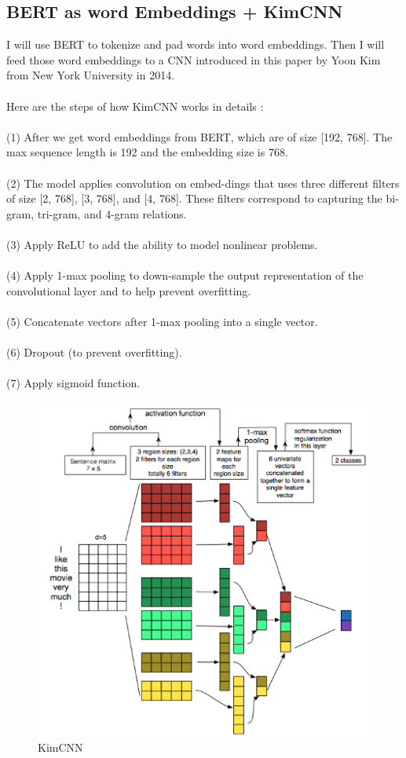\documentclass[11pt,a4paper]{article}
\begin{document}
\subsection{BERT as word Embeddings + KimCNN}

I will use BERT to tokenize and pad words into word embeddings. Then I will feed those word embeddings to a CNN introduced in this paper \cite{kimcnn} by Yoon Kim from New York University in 2014.\\
\\
Here are the steps of how KimCNN works in details \cite{kimcnn}:\\
\\
(1) After we get word embeddings from BERT, which are of size [192, 768]. The max sequence length is 192 and the embedding size is 768.\\
\\
(2) The model applies convolution on embed-dings that uses three different filters of size [2, 768], [3, 768], and [4, 768]. These filters correspond to capturing the bi-gram, tri-gram, and 4-gram relations.\\
\\
(3) Apply ReLU to add the ability to model nonlinear problems.\\
\\
(4) Apply 1-max pooling to down-sample the output representation of the convolutional layer and to help prevent overfitting.\\
\\
(5) Concatenate vectors after 1-max pooling into a single vector.\\
\\
(6) Dropout (to prevent overfitting).\\
\\
(7) Apply sigmoid function.\\

\begin{figure}[!htbp]
	\centering
	\includegraphics{figures/figure5.png}
	\caption{\label{fig:my-label} KimCNN \cite{kimcnn}}
\end{figure}
\end{document}
